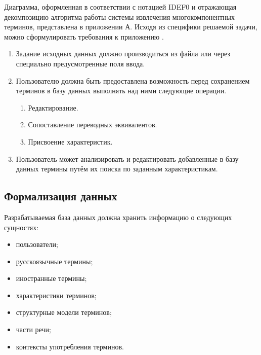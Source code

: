 Диаграмма, оформленная в соответствии с нотацией IDEF0 и отражающая декомпозицию алгоритма работы системы извлечения многокомпонентных терминов, представлена в приложении А. Исходя из специфики решаемой задачи, можно сформулировать требования к приложению \cite{My_article_2022}.


\begin{enumerate}[label*=\arabic*.]
	\item Задание исходных данных должно производиться из файла или через специально предусмотренные поля ввода.
	\item Пользователю должна быть предоставлена возможность перед сохранением терминов в базу данных выполнять над ними следующие операции.
	
	\begin{enumerate}[label*=\arabic*.]
		\item Редактирование.
		\item Сопоставление переводных эквивалентов.
		\item Присвоение характеристик.
		
	\end{enumerate}

	\item Пользователь может анализировать и редактировать добавленные в базу данных термины путём их поиска по заданным характеристикам.
	
\end{enumerate}



\subsection{Формализация данных}

Разрабатываемая база данных должна хранить информацию о следующих сущностях:

\begin{itemize}[label*=---]
	\item пользователи;
	\item русскоязычные термины;
	\item иностранные термины;
	\item характеристики терминов;
	\item структурные модели терминов;
	\item части речи;
	\item контексты употребления терминов.

\end{itemize}

